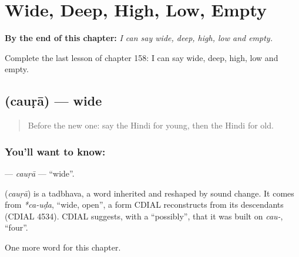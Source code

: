 
\chapter{Wide, Deep, High, Low, Empty}
\label{ch:hi-wide-deep-high-low-empty}

\begin{chapteropening}
\textbf{By the end of this chapter:} \emph{I can say wide, deep, high, low and empty.}

Complete the last lesson of chapter 158: I can say wide, deep, high, low and empty.
\end{chapteropening}

\section[\texorpdfstring{\hi{चौड़ा} (cauṛā)}{चौड़ा (cauṛā)}]{ (cauṛā) — wide}

\label{lesson:HI-C158-caura}



\begin{quote}
Before the new one: say the Hindi for young, then the Hindi for old.
\end{quote}

\subsection*{You'll want to know: }
\textbf{} — \emph{cauṛā} — \textquotedblleft{}wide\textquotedblright{}.

\begin{cousinweb}
\textbf{} (\emph{cauṛā}) is a tadbhava, a word inherited and reshaped by sound change. It comes from \emph{*ca-uḍa}, \textquotedblleft{}wide, open\textquotedblright{}, a form CDIAL reconstructs from its descendants (CDIAL 4534). CDIAL suggests, with a \textquotedblleft{}possibly\textquotedblright{}, that it was built on \emph{cau-}, \textquotedblleft{}four\textquotedblright{}.
\end{cousinweb}

\begin{grammarlens}[title={What you've built}]
One more word for this chapter.
\end{grammarlens}


